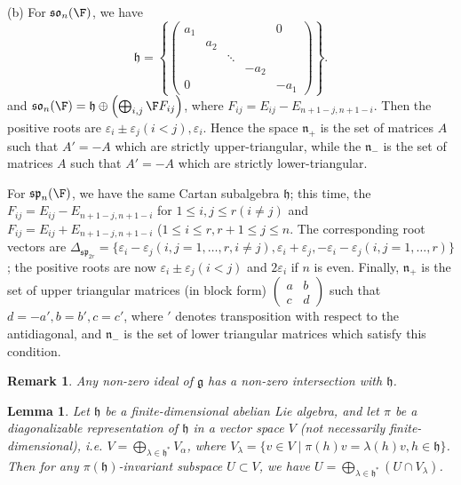 \documentclass[11pt]{article}
\newcommand{\so}{\mathfrak{so}}
\newcommand{\spp}{\mathfrak{sp}}
\newcommand{\g}{\mathfrak{g}}
\newcommand{\h}{\mathfrak{h}}
\newcommand{\n}{\mathfrak{n}}
\newtheorem{remark}{Remark}
\newtheorem{lemma}{Lemma}
\begin{document}
(b) For $\so_n(\F)$, we have
{\scriptsize \[ \h = \left\{ \left( \begin{array}{ccccc}
a_1 & & & & 0 \\ & a_2 \\ & & \ddots \\
& & & -a_2 \\ 0 & & & & -a_1 \end{array} \right) \right\}. \] }
and $\so_n(\F) = \h \oplus \left( \bigoplus_{i,j} \F F_{ij} \right)$,
where $F_{ij} = E_{ij} - E_{n+1-j, n+1-i}$.  Then the positive roots
are $\varepsilon_i \pm \varepsilon_j (i < j), \varepsilon_i$.
Hence the space $\n_+$ is the set of matrices $A$ such that
$A' = -A$ which are strictly upper-triangular, while the $\n_-$ is the set
of matrices $A$ such that $A' = -A$ which are strictly lower-triangular.

For $\spp_{n}(\F)$, we have the same Cartan subalgebra $\h$; this
time, the $F_{ij} = E_{ij} - E_{n+1-j, n+1-i}$ for $1 \le i, j \le r
(i \neq j)$ and $F_{ij} = E_{ij} + E_{n+1-j, n+1-i}$ ($1 \le i \le r,
r+1 \le j \le n$.  The corresponding root vectors are
$\Delta_{\spp_{2r}} = \{ \varepsilon_i - \varepsilon_j (i, j = 1,
\ldots, r, i \neq j), \varepsilon_i + \varepsilon_j,
-\varepsilon_i-\varepsilon_j (i, j = 1, \ldots, r)\}$; the positive
roots are now $\varepsilon_i \pm \varepsilon_j (i < j)$ and $2
\varepsilon_i$ if $n$ is even.  Finally, $\n_+$ is the 
set of upper triangular matrices (in block form) 
$\left( \begin{array}{cc} a & b\\ c & d \end{array} \right)$ such
that $d = -a', b = b', c = c'$, where $'$ denotes transposition
with respect to the antidiagonal, and $\n_-$ is the set of
lower triangular matrices which satisfy this condition.

\begin{remark} Any non-zero ideal of $\g$ has a non-zero 
intersection with $\h$. \end{remark}

\begin{lemma} Let $\h$ be a finite-dimensional abelian Lie algebra,
and let $\pi$ be a diagonalizable representation of $\h$ in a vector
space $V$ (not necessarily finite-dimensional), i.e. 
$V = \bigoplus_{\lambda \in \h^*} V_\alpha$, where $V_\lambda =
\{ v \in V \mid \pi(h)v = \lambda(h) v, h \in \h \}$.
Then for any $\pi(\h)$-invariant subspace $U \subset V$,
we have $U = \bigoplus_{\lambda \in \h^*} (U \cap V_\lambda)$.
\end{lemma}
\end{document}
